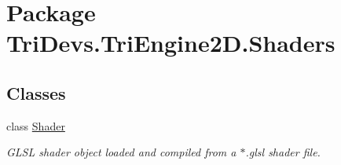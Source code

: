 \hypertarget{namespace_tri_devs_1_1_tri_engine2_d_1_1_shaders}{\section{Package Tri\-Devs.\-Tri\-Engine2\-D.\-Shaders}
\label{namespace_tri_devs_1_1_tri_engine2_d_1_1_shaders}
}
\subsection*{Classes}
\begin{DoxyCompactItemize}
\item 
class \hyperlink{class_tri_devs_1_1_tri_engine2_d_1_1_shaders_1_1_shader}{Shader}
\begin{DoxyCompactList}\small\item\em G\-L\-S\-L shader object loaded and compiled from a $\ast$.glsl shader file. \end{DoxyCompactList}\end{DoxyCompactItemize}
